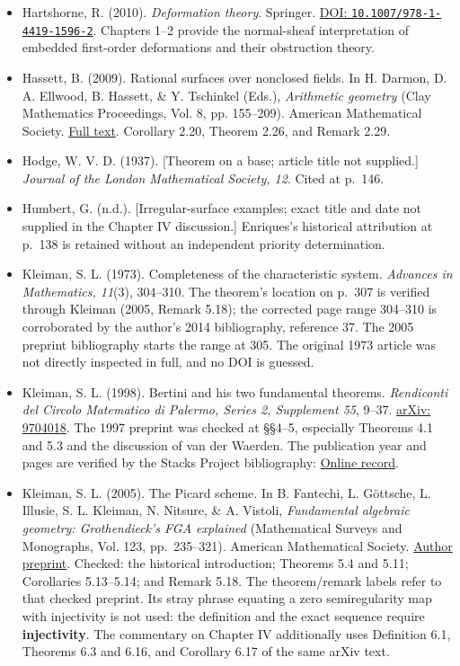 \begin{sloppypar}
\begin{itemize}
\item Hartshorne, R. (2010). \emph{Deformation theory}. Springer. \href{https://doi.org/10.1007/978-1-4419-1596-2}{DOI: \nolinkurl{10.1007/978-1-4419-1596-2}}. Chapters 1--2 provide the normal-sheaf interpretation of embedded first-order deformations and their obstruction theory.

\item Hassett, B. (2009). Rational surfaces over nonclosed fields. In H. Darmon, D. A. Ellwood, B. Hassett, \& Y. Tschinkel (Eds.), \emph{Arithmetic geometry} (Clay Mathematics Proceedings, Vol. 8, pp. 155--209). American Mathematical Society. \href{https://www.claymath.org/wp-content/uploads/2022/03/cmip08c.pdf}{Full text}. Corollary 2.20, Theorem 2.26, and Remark 2.29.

\item Hodge, W. V. D. (1937). {[}Theorem on a base; article title not supplied.{]} \emph{Journal of the London Mathematical Society, 12}. Cited at p.~146.

\item Humbert, G. (n.d.). {[}Irregular-surface examples; exact title and date not supplied in the Chapter IV discussion.{]} Enriques's historical attribution at p.~138 is retained without an independent priority determination.

\item Kleiman, S. L. (1973). Completeness of the characteristic system. \emph{Advances in Mathematics, 11}(3), 304--310. The theorem's location on p.~307 is verified through Kleiman (2005, Remark 5.18); the corrected page range 304--310 is corroborated by the author's 2014 bibliography, reference 37. The 2005 preprint bibliography starts the range at 305. The original 1973 article was not directly inspected in full, and no DOI is guessed.

\item Kleiman, S. L. (1998). Bertini and his two fundamental theorems. \emph{Rendiconti del Circolo Matematico di Palermo, Series 2, Supplement 55}, 9--37. \href{https://arxiv.org/abs/alg-geom/9704018}{arXiv: 9704018}. The 1997 preprint was checked at §§4--5, especially Theorems 4.1 and 5.3 and the discussion of van der Waerden. The publication year and pages are verified by the Stacks Project bibliography: \href{https://stacks.math.columbia.edu/bibliography/Kleiman-Bertini}{Online record}.

\item Kleiman, S. L. (2005). The Picard scheme. In B. Fantechi, L. Göttsche, L. Illusie, S. L. Kleiman, N. Nitsure, \& A. Vistoli, \emph{Fundamental algebraic geometry: Grothendieck's FGA explained} (Mathematical Surveys and Monographs, Vol. 123, pp.~235--321). American Mathematical Society. \href{https://arxiv.org/abs/math/0504020}{Author preprint}. Checked: the historical introduction; Theorems 5.4 and 5.11; Corollaries 5.13--5.14; and Remark 5.18. The theorem/remark labels refer to that checked preprint. Its stray phrase equating a zero semiregularity map with injectivity is not used: the definition and the exact sequence require \textbf{injectivity}. The commentary on Chapter IV additionally uses Definition 6.1, Theorems 6.3 and 6.16, and Corollary 6.17 of the same arXiv text.


\end{itemize}
\end{sloppypar}
